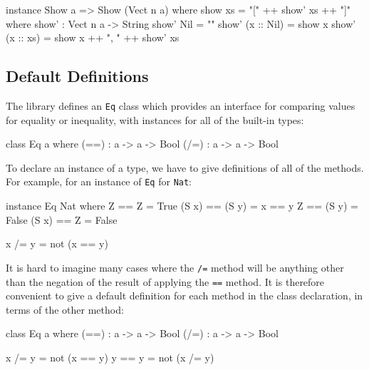 \begin{code}
instance Show a => Show (Vect n a) where
    show xs = "[" ++ show' xs ++ "]" where
        show' : Vect n a -> String
        show' Nil        = ""
        show' (x :: Nil) = show x
        show' (x :: xs)  = show x ++ ", " ++ show' xs
\end{code}


\subsection{Default Definitions}

The library defines an \texttt{Eq} class which provides an interface for comparing
values for equality or inequality, with instances for all of the built-in types:

\begin{code}
class Eq a where
    (==) : a -> a -> Bool
    (/=) : a -> a -> Bool
\end{code}

\noindent
To declare an instance of a type, we have to give definitions of all of the methods.
For example, for an instance of \texttt{Eq} for \texttt{Nat}:

\begin{code}
instance Eq Nat where
    Z     == Z     = True
    (S x) == (S y) = x == y
    Z     == (S y) = False
    (S x) == Z     = False

    x /= y = not (x == y)
\end{code}

\noindent
It is hard to imagine many cases where the \texttt{/=} method will be anything other
than the negation of the result of applying the \texttt{==} method. It is therefore
convenient to give a default definition for each method in the class
declaration, in terms of the other method:

\begin{code}
class Eq a where
    (==) : a -> a -> Bool
    (/=) : a -> a -> Bool

    x /= y = not (x == y)
    y == y = not (x /= y)
\end{code}

